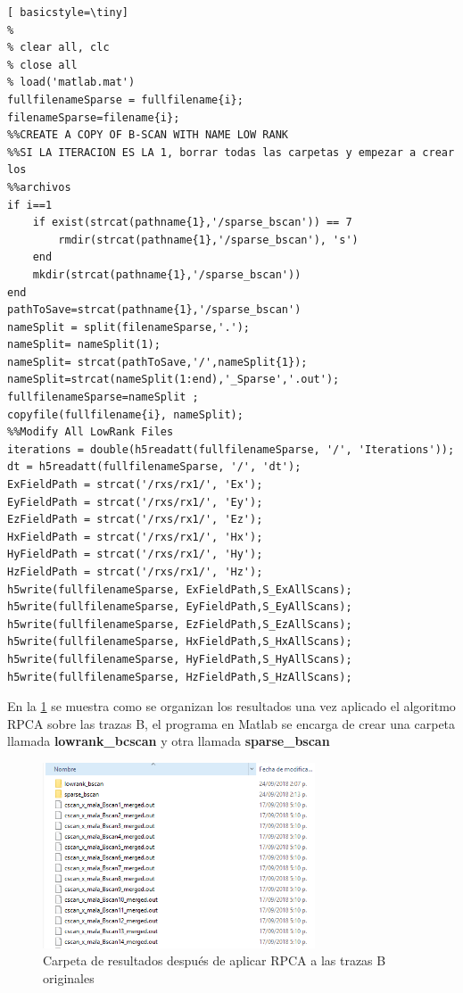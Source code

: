 \begin{lstlisting}[ basicstyle=\tiny]
%
% clear all, clc
% close all
% load('matlab.mat')
fullfilenameSparse = fullfilename{i};
filenameSparse=filename{i};
%%CREATE A COPY OF B-SCAN WITH NAME LOW RANK
%%SI LA ITERACION ES LA 1, borrar todas las carpetas y empezar a crear los
%%archivos
if i==1
    if exist(strcat(pathname{1},'/sparse_bscan')) == 7
        rmdir(strcat(pathname{1},'/sparse_bscan'), 's')
    end
    mkdir(strcat(pathname{1},'/sparse_bscan'))
end
pathToSave=strcat(pathname{1},'/sparse_bscan')
nameSplit = split(filenameSparse,'.');
nameSplit= nameSplit(1);
nameSplit= strcat(pathToSave,'/',nameSplit{1});
nameSplit=strcat(nameSplit(1:end),'_Sparse','.out');
fullfilenameSparse=nameSplit ;
copyfile(fullfilename{i}, nameSplit);
%%Modify All LowRank Files
iterations = double(h5readatt(fullfilenameSparse, '/', 'Iterations'));
dt = h5readatt(fullfilenameSparse, '/', 'dt');
ExFieldPath = strcat('/rxs/rx1/', 'Ex');
EyFieldPath = strcat('/rxs/rx1/', 'Ey');
EzFieldPath = strcat('/rxs/rx1/', 'Ez');
HxFieldPath = strcat('/rxs/rx1/', 'Hx');
HyFieldPath = strcat('/rxs/rx1/', 'Hy');
HzFieldPath = strcat('/rxs/rx1/', 'Hz');
h5write(fullfilenameSparse, ExFieldPath,S_ExAllScans);
h5write(fullfilenameSparse, EyFieldPath,S_EyAllScans);
h5write(fullfilenameSparse, EzFieldPath,S_EzAllScans);
h5write(fullfilenameSparse, HxFieldPath,S_HxAllScans);
h5write(fullfilenameSparse, HyFieldPath,S_HyAllScans);
h5write(fullfilenameSparse, HzFieldPath,S_HzAllScans);

\end{lstlisting}

En la \figurename{ \ref{fig:results_rpca_folders}} se muestra como se organizan los resultados una vez aplicado el algoritmo RPCA sobre las trazas B, el programa en Matlab se encarga de crear una carpeta llamada \textbf{lowrank\_bcscan} y otra llamada \textbf{sparse\_bscan}
\begin{figure}[H]
\centering
\includegraphics[height=5.5cm,keepaspectratio]{chapter2/images/resultado_rpca_trazasB.png}
\caption{Carpeta de resultados después de aplicar RPCA a las trazas B originales }
\label{fig:results_rpca_folders}
\end{figure}


